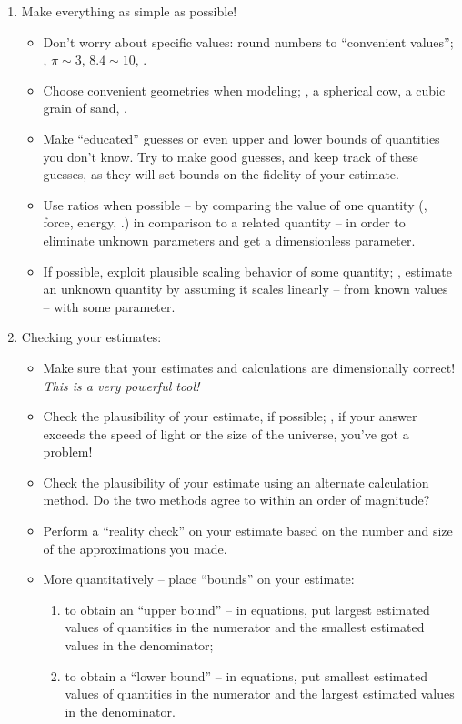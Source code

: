 \begin{enumerate}
\item Make everything as simple as possible!
%
\begin{itemize}
\item Don't worry about specific values: round numbers to ``convenient values''; \eg, $\pi\sim 3$, $8.4\sim 10$, \etc.
%
\item Choose convenient geometries when modeling; \eg, a spherical cow, a cubic grain of sand, \etc.
%
\item Make ``educated'' guesses or even upper and lower bounds of quantities you don't know. Try to make good guesses, and keep track of these guesses, as they will set bounds on the fidelity of your estimate.
%
\item Use ratios when possible -- by comparing the value of one quantity (\eg, force, energy, \etc.) in comparison to a related quantity -- in order to eliminate unknown parameters and get a dimensionless parameter.
%
\item If possible, exploit plausible scaling behavior of some quantity; \ie, estimate an unknown quantity by assuming it scales linearly -- from known values -- with some parameter.
\end{itemize}
%
\item Checking your estimates:
%
\begin{itemize}
\item Make sure that your estimates and calculations are dimensionally correct! \emph{This is a very powerful tool!}
%
\item Check the plausibility of your estimate, if possible; \eg, if your answer exceeds the speed of light or the size of the universe, you've got a problem!
%
\item Check the plausibility of your estimate using an alternate calculation method. Do the two methods agree to within an order of magnitude?
%
\item Perform a ``reality check'' on your estimate based on the number and size of the approximations you made.
%
\item More quantitatively -- place ``bounds'' on your estimate:
%
\begin{enumerate}
\item to obtain an ``upper bound'' -- in equations, put largest estimated values of quantities in the numerator and the smallest estimated values in the denominator;
\item to obtain a ``lower bound'' -- in equations, put smallest estimated values of quantities in the numerator and the largest estimated values in the denominator.
\end{enumerate}
%
\end{itemize}
%
\end{enumerate}


